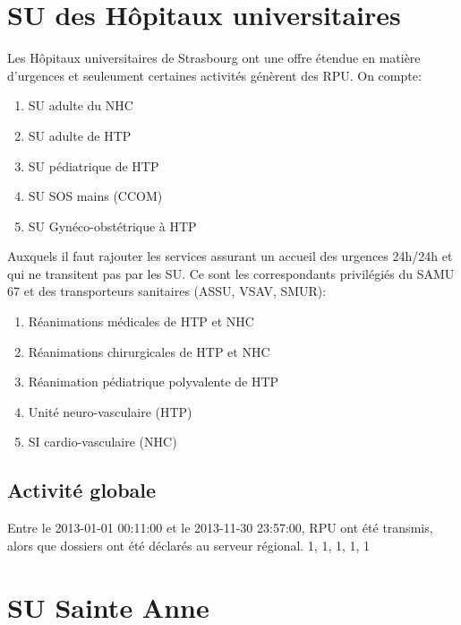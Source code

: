 \documentclass[12pt,english,french,twoside]{report}\usepackage[]{graphicx}\usepackage[]{color}
\begin{document}
\chapter{SU des Hôpitaux universitaires}



Les Hôpitaux universitaires de Strasbourg ont une offre étendue en matière d'urgences et seuleument certaines activités génèrent des RPU.
On compte:
\begin{enumerate}
  \item SU adulte du NHC
  \item SU adulte de HTP
  \item SU pédiatrique de HTP
  \item SU SOS mains (CCOM)
  \item SU Gynéco-obstétrique à HTP
\end{enumerate}
Auxquels il faut rajouter les services assurant un accueil des urgences 24h/24h et qui ne transitent pas par les SU. Ce sont les correspondants privilégiés du SAMU 67 et des transporteurs sanitaires (ASSU, VSAV, SMUR):
\begin{enumerate}
  \item Réanimations médicales de HTP et NHC
  \item Réanimations chirurgicales de HTP et NHC
  \item Réanimation pédiatrique polyvalente de HTP
  \item Unité neuro-vasculaire (HTP)
  \item SI cardio-vasculaire (NHC)
\end{enumerate}

\section{Activité globale}




Entre le 2013-01-01 00:11:00 et le 2013-11-30 23:57:00,  RPU ont été transmis, alors que  dossiers ont été déclarés au serveur régional. 
1, 1, 1, 1, 1



\chapter{SU Sainte Anne}

\end{document}

